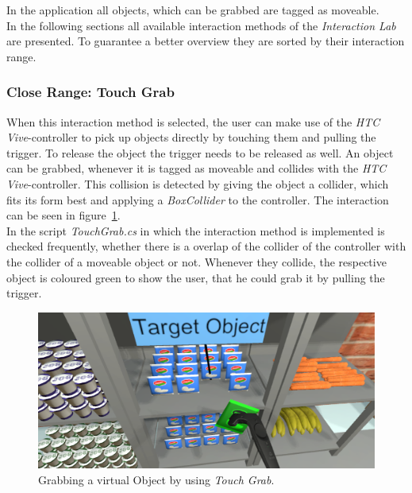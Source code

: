 In the application all objects, which can be grabbed are tagged as moveable.\\

In the following sections all available interaction methods of the \textit{Interaction Lab} are presented. To guarantee a better overview they are sorted by their interaction range. 

\subsubsection{Close Range: Touch Grab} \label{sec:TouchGrab}
When this interaction method is selected, the user can make use of the \textit{HTC Vive}-controller to pick up objects directly by touching them and pulling the trigger. To release the object the trigger needs to be released as well. An object can be grabbed, whenever it is tagged as moveable and collides with the \textit{HTC Vive}-controller. This collision is detected by giving the object a collider, which fits its form best \cite{website:BoxCollider}\cite{website:SphereCollider} and applying a \textit{BoxCollider} to the controller. The interaction can be seen in figure~\ref{fig:touchGrab}. \\
In the script \textit{TouchGrab.cs} in which the interaction method is implemented is checked frequently, whether there is a overlap of the collider of the controller with the collider of a moveable object or not. Whenever they collide, the respective object is coloured green to show the user, that he could grab it by pulling the trigger. 

\begin{figure}[H] 
	\center 
	\includegraphics[width=12cm]{Images/TouchGrab.PNG}			
	\caption[Grabbing a virtual Object by using \textit{Touch Grab}.]{Grabbing a virtual Object by using \textit{Touch Grab}.}
	\label{fig:touchGrab}
\end{figure}

